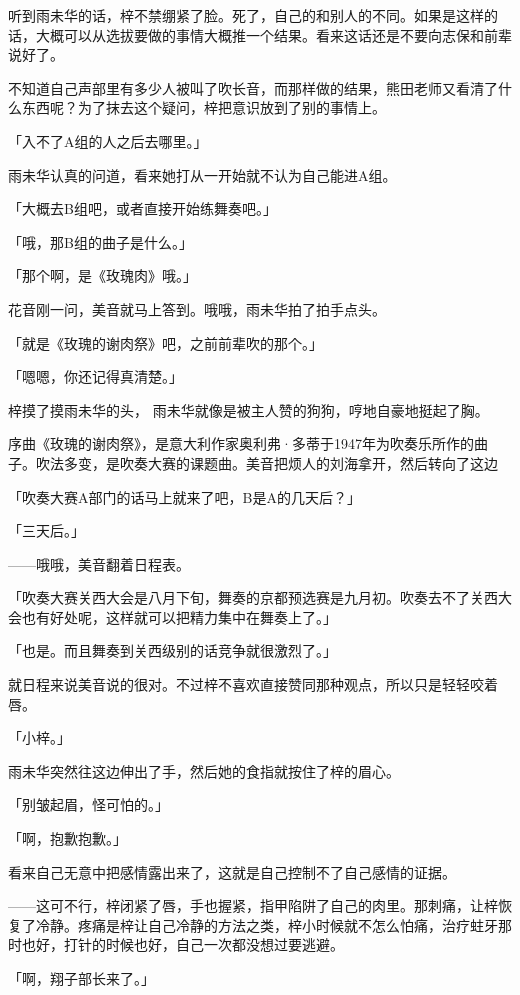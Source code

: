\documentclass[UTF8]{ctexart}
\begin{document}
    听到雨未华的话，梓不禁绷紧了脸。死了，自己的和别人的不同。如果是这样的话，大概可以从选拔要做的事情大概推一个结果。看来这话还是不要向志保和前辈说好了。

    不知道自己声部里有多少人被叫了吹长音，而那样做的结果，熊田老师又看清了什么东西呢？为了抹去这个疑问，梓把意识放到了别的事情上。

    「入不了A组的人之后去哪里。」

    雨未华认真的问道，看来她打从一开始就不认为自己能进A组。

    「大概去B组吧，或者直接开始练舞奏吧。」

    「哦，那B组的曲子是什么。」

    「那个啊，是《玫瑰肉》哦。」

    花音刚一问，美音就马上答到。哦哦，雨未华拍了拍手点头。

    「就是《玫瑰的谢肉祭》吧，之前前辈吹的那个。」

    「嗯嗯，你还记得真清楚。」

    梓摸了摸雨未华的头， 雨未华就像是被主人赞的狗狗，哼地自豪地挺起了胸。

    序曲《玫瑰的谢肉祭》，是意大利作家奥利弗·多蒂于1947年为吹奏乐所作的曲子。吹法多变，是吹奏大赛的课题曲。美音把烦人的刘海拿开，然后转向了这边

    「吹奏大赛A部门的话马上就来了吧，B是A的几天后？」

    「三天后。」

    ——哦哦，美音翻着日程表。

    「吹奏大赛关西大会是八月下旬，舞奏的京都预选赛是九月初。吹奏去不了关西大会也有好处呢，这样就可以把精力集中在舞奏上了。」

    「也是。而且舞奏到关西级别的话竞争就很激烈了。」

    就日程来说美音说的很对。不过梓不喜欢直接赞同那种观点，所以只是轻轻咬着唇。

    「小梓。」

    雨未华突然往这边伸出了手，然后她的食指就按住了梓的眉心。

    「别皱起眉，怪可怕的。」

    「啊，抱歉抱歉。」

    看来自己无意中把感情露出来了，这就是自己控制不了自己感情的证据。

    ——这可不行，梓闭紧了唇，手也握紧，指甲陷阱了自己的肉里。那刺痛，让梓恢复了冷静。疼痛是梓让自己冷静的方法之类，梓小时候就不怎么怕痛，治疗蛀牙那时也好，打针的时候也好，自己一次都没想过要逃避。

    「啊，翔子部长来了。」
\end{document}
